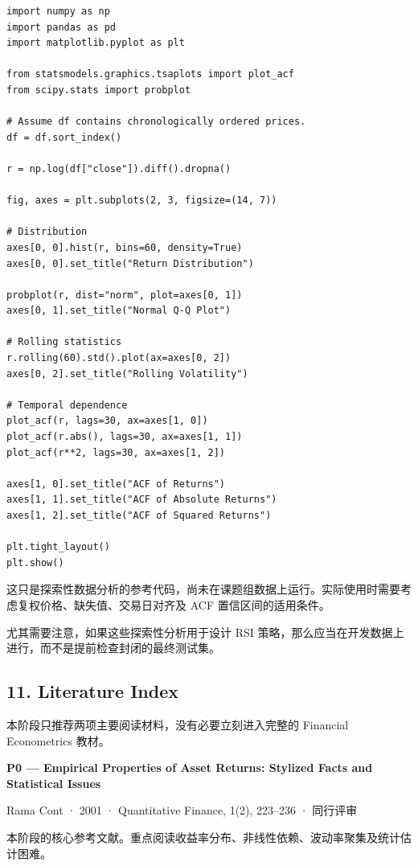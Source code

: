 \begin{verbatim}
import numpy as np
import pandas as pd
import matplotlib.pyplot as plt

from statsmodels.graphics.tsaplots import plot_acf
from scipy.stats import probplot

# Assume df contains chronologically ordered prices.
df = df.sort_index()

r = np.log(df["close"]).diff().dropna()

fig, axes = plt.subplots(2, 3, figsize=(14, 7))

# Distribution
axes[0, 0].hist(r, bins=60, density=True)
axes[0, 0].set_title("Return Distribution")

probplot(r, dist="norm", plot=axes[0, 1])
axes[0, 1].set_title("Normal Q-Q Plot")

# Rolling statistics
r.rolling(60).std().plot(ax=axes[0, 2])
axes[0, 2].set_title("Rolling Volatility")

# Temporal dependence
plot_acf(r, lags=30, ax=axes[1, 0])
plot_acf(r.abs(), lags=30, ax=axes[1, 1])
plot_acf(r**2, lags=30, ax=axes[1, 2])

axes[1, 0].set_title("ACF of Returns")
axes[1, 1].set_title("ACF of Absolute Returns")
axes[1, 2].set_title("ACF of Squared Returns")

plt.tight_layout()
plt.show()
\end{verbatim}

这只是探索性数据分析的参考代码，尚未在课题组数据上运行。实际使用时需要考虑复权价格、缺失值、交易日对齐及 ACF 置信区间的适用条件。

尤其需要注意，如果这些探索性分析用于设计 RSI 策略，那么应当在开发数据上进行，而不是提前检查封闭的最终测试集。

\hypertarget{part-4-52-0680-literature-index}{%
\subsection{11. Literature Index}\label{part-4-52-0680-literature-index}}

本阶段只推荐两项主要阅读材料，没有必要立刻进入完整的 Financial Econometrics 教材。

\textbf{P0 --- Empirical Properties of Asset Returns: Stylized Facts and Statistical Issues}

Rama Cont · 2001 · Quantitative Finance, 1(2), 223--236 · 同行评审

本阶段的核心参考文献。重点阅读收益率分布、非线性依赖、波动率聚集及统计估计困难。

